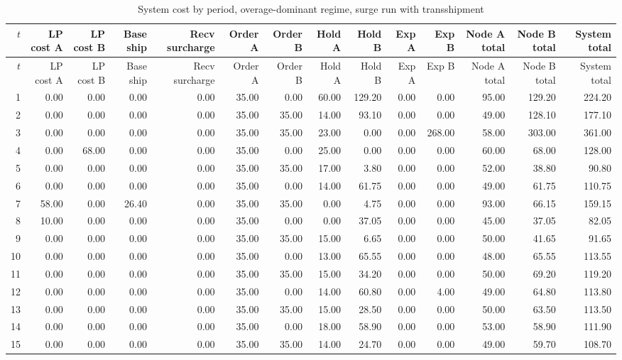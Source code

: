 \documentclass[11pt]{article}
\begin{document}
\begin{landscape}
\begin{longtable}{rrrrrrrrrrrrrr}
\caption{System cost by period, overage-dominant regime, surge run with transshipment}\label{tab:appendix-overage-cost}\\
\toprule
$t$ & LP cost A & LP cost B & Base ship & Recv surcharge & Order A & Order B & Hold A & Hold B & Exp A & Exp B & Node A total & Node B total & System total \\
\midrule
\endfirsthead
\toprule
$t$ & LP cost A & LP cost B & Base ship & Recv surcharge & Order A & Order B & Hold A & Hold B & Exp A & Exp B & Node A total & Node B total & System total \\
\midrule
\endhead
1 & 0.00 & 0.00 & 0.00 & 0.00 & 35.00 & 0.00 & 60.00 & 129.20 & 0.00 & 0.00 & 95.00 & 129.20 & 224.20 \\
2 & 0.00 & 0.00 & 0.00 & 0.00 & 35.00 & 35.00 & 14.00 & 93.10 & 0.00 & 0.00 & 49.00 & 128.10 & 177.10 \\
3 & 0.00 & 0.00 & 0.00 & 0.00 & 35.00 & 35.00 & 23.00 & 0.00 & 0.00 & 268.00 & 58.00 & 303.00 & 361.00 \\
4 & 0.00 & 68.00 & 0.00 & 0.00 & 35.00 & 0.00 & 25.00 & 0.00 & 0.00 & 0.00 & 60.00 & 68.00 & 128.00 \\
5 & 0.00 & 0.00 & 0.00 & 0.00 & 35.00 & 35.00 & 17.00 & 3.80 & 0.00 & 0.00 & 52.00 & 38.80 & 90.80 \\
6 & 0.00 & 0.00 & 0.00 & 0.00 & 35.00 & 0.00 & 14.00 & 61.75 & 0.00 & 0.00 & 49.00 & 61.75 & 110.75 \\
7 & 58.00 & 0.00 & 26.40 & 0.00 & 35.00 & 35.00 & 0.00 & 4.75 & 0.00 & 0.00 & 93.00 & 66.15 & 159.15 \\
8 & 10.00 & 0.00 & 0.00 & 0.00 & 35.00 & 0.00 & 0.00 & 37.05 & 0.00 & 0.00 & 45.00 & 37.05 & 82.05 \\
9 & 0.00 & 0.00 & 0.00 & 0.00 & 35.00 & 35.00 & 15.00 & 6.65 & 0.00 & 0.00 & 50.00 & 41.65 & 91.65 \\
10 & 0.00 & 0.00 & 0.00 & 0.00 & 35.00 & 0.00 & 13.00 & 65.55 & 0.00 & 0.00 & 48.00 & 65.55 & 113.55 \\
11 & 0.00 & 0.00 & 0.00 & 0.00 & 35.00 & 35.00 & 15.00 & 34.20 & 0.00 & 0.00 & 50.00 & 69.20 & 119.20 \\
12 & 0.00 & 0.00 & 0.00 & 0.00 & 35.00 & 0.00 & 14.00 & 60.80 & 0.00 & 4.00 & 49.00 & 64.80 & 113.80 \\
13 & 0.00 & 0.00 & 0.00 & 0.00 & 35.00 & 35.00 & 15.00 & 28.50 & 0.00 & 0.00 & 50.00 & 63.50 & 113.50 \\
14 & 0.00 & 0.00 & 0.00 & 0.00 & 35.00 & 0.00 & 18.00 & 58.90 & 0.00 & 0.00 & 53.00 & 58.90 & 111.90 \\
15 & 0.00 & 0.00 & 0.00 & 0.00 & 35.00 & 35.00 & 14.00 & 24.70 & 0.00 & 0.00 & 49.00 & 59.70 & 108.70 \\
\bottomrule
\end{longtable}


\end{landscape}
\end{document}

